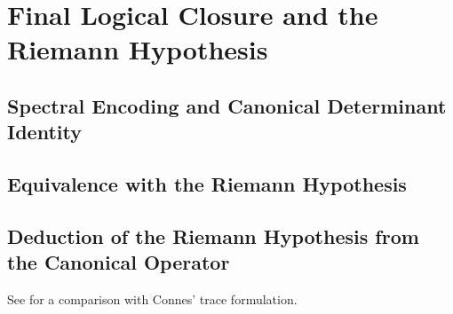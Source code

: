 \section{Final Logical Closure and the Riemann Hypothesis}
\label{sec:logical_closure}




\subsection{Spectral Encoding and Canonical Determinant Identity}










\subsection{Equivalence with the Riemann Hypothesis}







\subsection{Deduction of the Riemann Hypothesis from the Canonical Operator}







See  for a comparison with Connes’ trace formulation.


